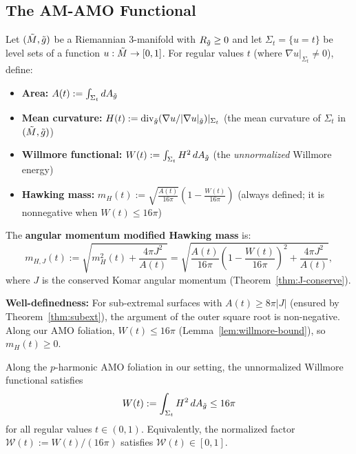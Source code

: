 \subsection{The AM-AMO Functional}

\begin{definition}\label{def:am-hawking}
Let $(\tilde{M}, \tilde{g})$ be a Riemannian 3-manifold with $R_{\tilde{g}} \geq 0$ and let $\Sigma_t = \{u = t\}$ be level sets of a function $u: \tilde{M} \to [0,1]$. For regular values $t$ (where $\nabla u|_{\Sigma_t} \neq 0$), define:
\begin{itemize}
    \item \textbf{Area:} $A(t) := \int_{\Sigma_t} dA_{\tilde{g}}$
    \item \textbf{Mean curvature:} $H(t) := \mathrm{div}_{\tilde{g}}(\nabla u/|\nabla u|_{\tilde{g}})|_{\Sigma_t}$ (the mean curvature of $\Sigma_t$ in $(\tilde{M}, \tilde{g})$)
    \item \textbf{Willmore functional:} $W(t) := \int_{\Sigma_t} H^2 \, dA_{\tilde{g}}$ (the \emph{unnormalized} Willmore energy)
    \item \textbf{Hawking mass:} $m_H(t) := \sqrt{\frac{A(t)}{16\pi}}\left(1 - \frac{W(t)}{16\pi}\right)$ (always defined; it is nonnegative when $W(t) \leq 16\pi$)
\end{itemize}

The \textbf{angular momentum modified Hawking mass} is:
\begin{equation}\label{eq:am-hawking}
m_{H,J}(t) := \sqrt{m_H^2(t) + \frac{4\pi J^2}{A(t)}} = \sqrt{\frac{A(t)}{16\pi}\left(1 - \frac{W(t)}{16\pi}\right)^2 + \frac{4\pi J^2}{A(t)}},
\end{equation}
where $J$ is the conserved Komar angular momentum (Theorem~\ref{thm:J-conserve}).


    \textbf{Well-definedness:} For sub-extremal surfaces with $A(t) \geq 8\pi|J|$ (ensured by Theorem~\ref{thm:subext}), the argument of the outer square root is non-negative. Along our AMO foliation, $W(t) \leq 16\pi$ (Lemma~\ref{lem:willmore-bound}), so $m_H(t) \geq 0$.
\end{definition}

\begin{lemma}\label{lem:willmore-bound}
Along the $p$-harmonic AMO foliation in our setting, the unnormalized Willmore functional satisfies
\begin{equation}\label{eq:willmore-bound}
W(t) := \int_{\Sigma_t} H^2\, dA_{\tilde{g}} \leq 16\pi
\end{equation}
for all regular values $t \in (0,1)$. Equivalently, the normalized factor $\mathcal{W}(t) := W(t)/(16\pi)$ satisfies $\mathcal{W}(t) \in [0,1]$.
\end{lemma}

